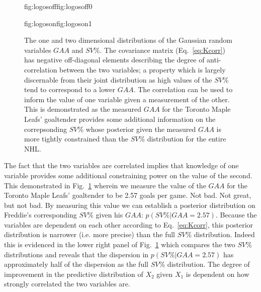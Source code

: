 \begin{figure}
  \centering
  \hspace{-0.9\hsize}%
  \begin{ocg}{fig:logosoff}{fig:logosoff}{0}%
  \end{ocg}%
  \begin{ocg}{fig:logoson}{fig:logoson}{1}%
  \end{ocg}
  \caption[Correlated Gaussian random variables in two dimensions.]
      {The one and two dimensional distributions of the Gaussian random
    variables $GAA$ and $SV$\%.
    The covariance matrix (Eq.~\ref{eq:Kcorr}) has negative off-diagonal
    elements describing the degree of anti-correlation between the two
    variables; a property which is largely discernable from their joint
    distribution as high values of the $SV$\% tend to correspond to a lower
    $GAA$. The correlation can be used to inform the value of one variable given a
    measurement of the other. This is demonstrated as the measured $GAA$ 
    for the Toronto Maple Leafs' goaltender 
    provides some
    additional information on the correpsonding $SV$\% whose posterior given the
    measured $GAA$ is more tightly constrained than the $SV$\% distribution for
    the entire NHL.}
  \label{fig:corr2d}
\end{figure}

The fact that the two variables are
correlated implies that knowledge of one variable provides some additional constraining
power on the value of the second. This demonstrated in Fig.~\ref{fig:corr2d}
wherein we measure the value of the $GAA$ for the Toronto Maple Leafs' goaltender
to be 2.57 goals per game. Not bad. Not great, but not bad. By measuring
this value we can establish a posterior distribution on Freddie's corresponding
$SV$\% given his $GAA$: $p(SV\%|GAA=2.57)$. Because the variables are dependent
on each other according to Eq.~\ref{eq:Kcorr}, this posterior distribution is
narrower (i.e. more precise) than the full $SV$\% distribution. Indeed this is
evidenced in the lower right panel of Fig.~\ref{fig:corr2d} which compares the
two $SV$\% distributions and reveals that the dispersion in $p(SV\%|GAA=2.57)$
has approximately half of the dispersion as the full $SV$\% distribution. The degree
of improvement in the predictive distribution of $X_2$ given $X_1$ is dependent
on how strongly correlated the two variables are. \\

